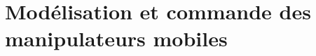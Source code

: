 \documentclass[french]{beamer}
\begin{document}
%


\section{Modélisation et commande des manipulateurs mobiles}
\begin{frame}
\small{}
\end{frame}
\end{document}
